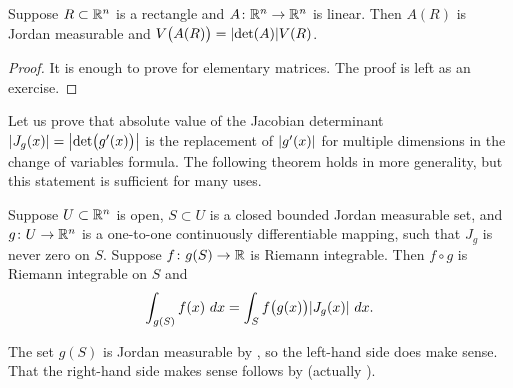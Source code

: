\begin{prop} \label{prop:volrectdet}
Suppose $R \subset {\mathbb{R}}^n$ is a rectangle
and $A \colon {\mathbb{R}}^n \to {\mathbb{R}}^n$ is linear.  Then
$A(R)$ is Jordan measurable and $V\bigl(A(R)\bigr) = \lvert {\det (A)} \rvert V(R)$.
\end{prop}

\begin{proof}
It is enough to prove for elementary matrices.  The proof is left as an
exercise.
\end{proof}

Let us prove that
absolute value of the Jacobian determinant
$\lvert {J_g(x)} \rvert = \bigl\lvert {\det \bigl(g'(x)\bigr)} \bigr\rvert$
is the replacement of $\lvert {g'(x)} \rvert$ for multiple
dimensions in the change of variables formula.
The following theorem holds in more generality,
but this statement is sufficient for many uses.

\begin{thm}
Suppose $U \subset {\mathbb{R}}^n$ is open,
$S \subset U$ is a closed bounded Jordan measurable set, and
$g \colon U \to {\mathbb{R}}^n$ is a one-to-one
continuously differentiable mapping, such that
$J_g$ is never zero on $S$.
Suppose $f \colon g(S) \to {\mathbb{R}}$ is Riemann integrable.
Then $f \circ g$ is Riemann integrable on $S$ and
\begin{equation*}
\int_{g(S)} f(x) ~ dx = 
\int_S f\bigl(g(x)\bigr) \lvert {J_g(x)} \rvert ~ dx .
\end{equation*}
\end{thm}

The set $g(S)$ is Jordan measurable by ,
so the left-hand side does make sense.
That the right-hand side makes sense follows by
 (actually
).

